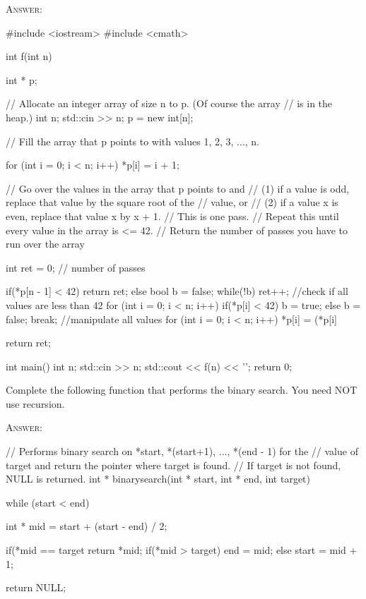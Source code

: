 \textsc{Answer:}\vspace{-3mm}
\begin{answercode}
#include <iostream>
#include <cmath>

int f(int n)
{
    int * p;

    // Allocate an integer array of size n to p. (Of course the array
    // is in the heap.)
    int n;
    std::cin >> n;
    p = new int[n];

    // Fill the array that p points to with values 1, 2, 3, ..., n.

    for (int i = 0; i < n; i++)
    {
      *p[i] = i + 1;
    }

    // Go over the values in the array that p points to and 
    // (1) if a value is odd, replace that value by the square root of the
    //     value, or
    // (2) if a value x is even, replace that value x by x + 1. 
    // This is one pass.
    // Repeat this until every value in the array is <= 42.
    // Return the number of passes you have to run over the array

    int ret = 0; // number of passes
    
    if(*p[n - 1] < 42) return ret;
    else
    {
      bool b = false;
      while(!b)
      {
        ret++;
        //check if all values are less than 42
        for (int i = 0; i < n; i++)
        {
          if(*p[i] < 42) b = true;
          else
          {
            b = false;
            break;
          }
        }
        //manipulate all values
        for (int i = 0; i < n; i++)
        {
          *p[i] = (*p[i] %
        }
      }
     }

    return ret;
}

int main()
{
    int n;
    std::cin >> n;
    std::cout << f(n) << '\n';
    return 0;
}
\end{answercode}

\newpage
\nextq
Complete the following function that performs the binary search.
You need NOT use recursion.
    
\textsc{Answer:}\vspace{-2mm}
\begin{answercode}
// Performs binary search on *start, *(start+1), ..., *(end - 1) for the
// value of target and return the pointer where target is found.
// If target is not found, NULL is returned.
int * binarysearch(int * start, int * end, int target)
{
  while (start < end)
  {
    int * mid = start + (start - end) / 2;

    if(*mid == target
    {
      return *mid;
    }
    if(*mid > target)
    {
      end = mid;
    }
    else
    {
      start = mid + 1;
    }
  }
  
  return NULL;
}
\end{answercode}

